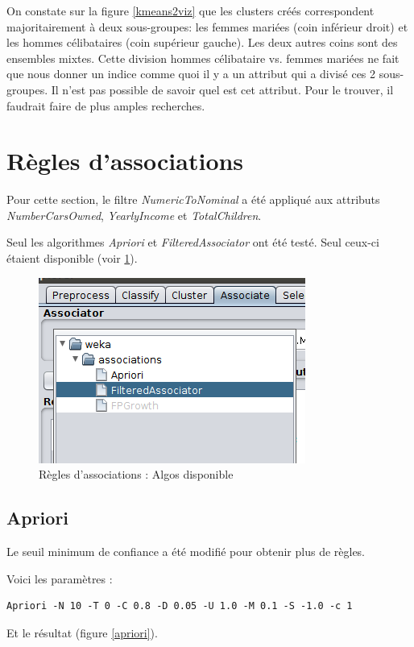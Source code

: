     On constate sur la figure \ref{kmeans2viz} que les clusters créés correspondent majoritairement à deux sous-groupes: les femmes mariées (coin inférieur droit) et les hommes célibataires (coin supérieur gauche). Les deux autres coins sont des ensembles mixtes. Cette division hommes célibataire vs. femmes mariées ne fait que nous donner un indice comme quoi il y a un attribut qui a divisé ces 2 sous-groupes. Il n'est pas possible de savoir quel est cet attribut. Pour le trouver, il faudrait faire de plus amples recherches.

\section{Règles d'associations}

Pour cette section, le filtre \textit{NumericToNominal} a été appliqué aux attributs \textit{NumberCarsOwned}, \textit{YearlyIncome} et \textit{TotalChildren}.

Seul les algorithmes \textit{Apriori} et \textit{FilteredAssociator} ont été testé. Seul ceux-ci étaient disponible (voir \ref{associate}).

\begin{figure}[H]
    \centering
    \includegraphics[width=0.5\linewidth, fbox]{img/associate.png}
    \caption{Règles d'associations : Algos disponible}
    \label{associate}
\end{figure}

\subsection{Apriori}

Le seuil minimum de confiance a été modifié pour obtenir plus de règles.

Voici les paramètres :

\begin{lstlisting}
Apriori -N 10 -T 0 -C 0.8 -D 0.05 -U 1.0 -M 0.1 -S -1.0 -c 1
\end{lstlisting}

Et le résultat (figure \ref{apriori}).

